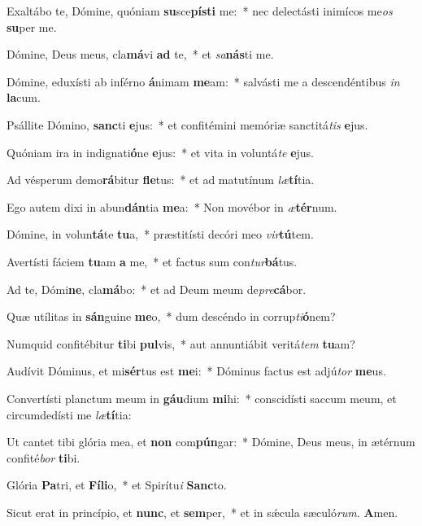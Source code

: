 \item Exaltábo te, Dómine, quóniam \textbf{su}sce\textbf{pís}\textbf{ti} me:~* nec delectásti inimícos me\textit{os} \textbf{su}per me.
\item Dómine, Deus meus, cla\textbf{má}vi \textbf{ad} te,~* et \textit{sa}\textbf{nás}ti me.
\item Dómine, eduxísti ab inférno \textbf{á}nimam \textbf{me}am:~* salvásti me a descendéntibus \textit{in} \textbf{la}cum.
\item Psállite Dómino, \textbf{sanc}ti \textbf{e}jus:~* et confitémini memóriæ sanctitá\textit{tis} \textbf{e}jus.
\item Quóniam ira in indignati\textbf{ó}ne \textbf{e}jus:~* et vita in voluntá\textit{te} \textbf{e}jus.
\item Ad vésperum demo\textbf{rá}bitur \textbf{fle}tus:~* et ad matutínum \textit{læ}\textbf{tí}tia.
\item Ego autem dixi in abun\textbf{dán}tia \textbf{me}a:~* Non movébor in \textit{æ}\textbf{tér}num.
\item Dómine, in volun\textbf{tá}te \textbf{tu}a,~* præstitísti decóri meo \textit{vir}\textbf{tú}tem.
\item Avertísti fáciem \textbf{tu}am \textbf{a} me,~* et factus sum con\textit{tur}\textbf{bá}tus.
\item Ad te, Dómi\textbf{ne}, cla\textbf{má}bo:~* et ad Deum meum de\textit{pre}\textbf{cá}bor.
\item Quæ utílitas in \textbf{sán}guine \textbf{me}o,~* dum descéndo in corrup\textit{ti}\textbf{ó}nem?
\item Numquid confitébitur \textbf{ti}bi \textbf{pul}vis,~* aut annuntiábit veritá\textit{tem} \textbf{tu}am?
\item Audívit Dóminus, et mi\textbf{sér}tus est \textbf{me}i:~* Dóminus factus est adjú\textit{tor} \textbf{me}us.
\item Convertísti planctum meum in \textbf{gáu}dium \textbf{mi}hi:~* conscidísti saccum meum, et circumdedísti me \textit{læ}\textbf{tí}tia:
\item Ut cantet tibi glória mea, et \textbf{non} com\textbf{pún}gar:~* Dómine, Deus meus, in ætérnum confité\textit{bor} \textbf{ti}bi.
\item Glória \textbf{Pa}tri, et \textbf{Fí}\textbf{li}o,~* et Spirítu\textit{i} \textbf{Sanc}to.
\item Sicut erat in princípio, et \textbf{nunc}, et \textbf{sem}per,~* et in sǽcula sæculó\textit{rum}. \textbf{A}men.
